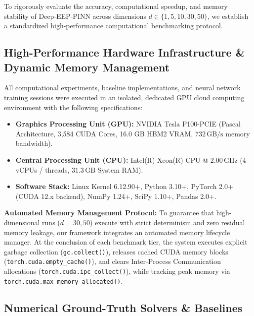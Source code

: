 \documentclass[11pt,a4paper]{article}
\begin{document}
To rigorously evaluate the accuracy, computational speedup, and memory stability of Deep-EEP-PINN across dimensions $d \in \{1, 5, 10, 30, 50\}$, we establish a standardized high-performance computational benchmarking protocol.

\subsection{High-Performance Hardware Infrastructure \& Dynamic Memory Management}
All computational experiments, baseline implementations, and neural network training sessions were executed in an isolated, dedicated GPU cloud computing environment with the following specifications:
\begin{itemize}
    \item \textbf{Graphics Processing Unit (GPU):} NVIDIA Tesla P100-PCIE (Pascal Architecture, 3,584 CUDA Cores, 16.0 GB HBM2 VRAM, $732\,\text{GB/s}$ memory bandwidth).
    \item \textbf{Central Processing Unit (CPU):} Intel(R) Xeon(R) CPU @ $2.00\,\text{GHz}$ ($4$ vCPUs / threads, $31.3\,\text{GB}$ System RAM).
    \item \textbf{Software Stack:} Linux Kernel 6.12.90+, Python 3.10+, PyTorch 2.0+ (CUDA 12.x backend), NumPy 1.24+, SciPy 1.10+, Pandas 2.0+.
\end{itemize}

\noindent\textbf{Automated Memory Management Protocol:}
To guarantee that high-dimensional runs ($d=30, 50$) execute with strict determinism and zero residual memory leakage, our framework integrates an automated memory lifecycle manager. At the conclusion of each benchmark tier, the system executes explicit garbage collection (\texttt{gc.collect()}), releases cached CUDA memory blocks (\texttt{torch.cuda.empty\_cache()}), and clears Inter-Process Communication allocations (\texttt{torch.cuda.ipc\_collect()}), while tracking peak memory via \texttt{torch.cuda.max\_memory\_allocated()}.

\subsection{Numerical Ground-Truth Solvers \& Baselines}
\end{document}
